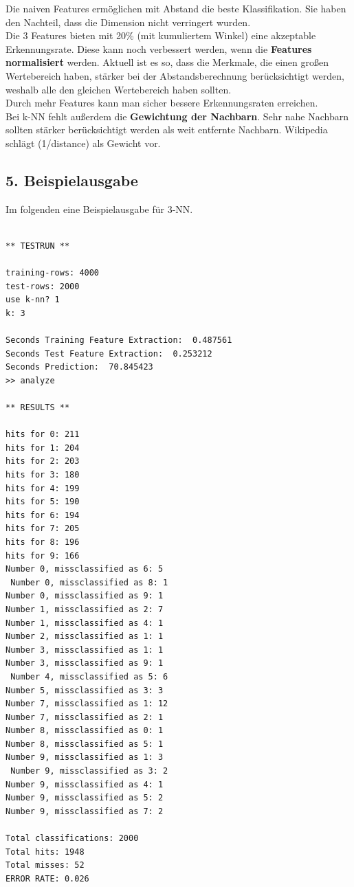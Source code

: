 \documentclass{article}
\begin{document}
				Die naiven Features ermöglichen mit Abstand die beste Klassifikation. Sie haben den Nachteil, dass die Dimension nicht verringert wurden.\\
				
				Die 3 Features bieten mit 20\% (mit kumuliertem Winkel) eine akzeptable Erkennungsrate. Diese kann noch verbessert werden, wenn die \textbf{Features normalisiert} werden. Aktuell ist es so, dass die Merkmale, die einen großen Wertebereich haben, stärker bei der Abstandsberechnung berücksichtigt werden, weshalb alle den gleichen Wertebereich haben sollten.\\
				
				Durch mehr Features kann man sicher bessere Erkennungsraten erreichen.\\
				
				Bei k-NN fehlt außerdem die \textbf{Gewichtung der Nachbarn}. Sehr nahe Nachbarn sollten stärker berücksichtigt werden als weit entfernte Nachbarn. Wikipedia schlägt (1/distance) als Gewicht vor.
				
		\subsection*{5. Beispielausgabe}
			Im folgenden eine Beispielausgabe für 3-NN.
		\begin{verbatim}

** TESTRUN **

training-rows: 4000
test-rows: 2000
use k-nn? 1
k: 3

Seconds Training Feature Extraction:  0.487561
Seconds Test Feature Extraction:  0.253212
Seconds Prediction:  70.845423
>> analyze
 
** RESULTS **

hits for 0: 211
hits for 1: 204
hits for 2: 203
hits for 3: 180
hits for 4: 199
hits for 5: 190
hits for 6: 194
hits for 7: 205
hits for 8: 196
hits for 9: 166
Number 0, missclassified as 6: 5
 Number 0, missclassified as 8: 1
Number 0, missclassified as 9: 1
Number 1, missclassified as 2: 7
Number 1, missclassified as 4: 1
Number 2, missclassified as 1: 1
Number 3, missclassified as 1: 1
Number 3, missclassified as 9: 1
 Number 4, missclassified as 5: 6
Number 5, missclassified as 3: 3
Number 7, missclassified as 1: 12
Number 7, missclassified as 2: 1
Number 8, missclassified as 0: 1
Number 8, missclassified as 5: 1
Number 9, missclassified as 1: 3
 Number 9, missclassified as 3: 2
Number 9, missclassified as 4: 1
Number 9, missclassified as 5: 2
Number 9, missclassified as 7: 2

Total classifications: 2000
Total hits: 1948
Total misses: 52
ERROR RATE: 0.026
		\end{verbatim}
		
		
\end{document}
